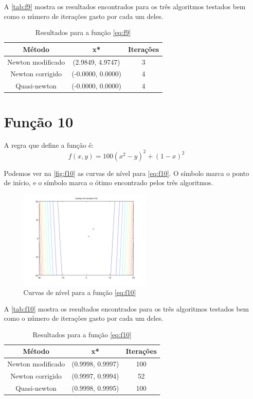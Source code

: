 \documentclass[12pt]{article}
\begin{document}
A \autoref{tab:f9} mostra os resultados encontrados para os três algoritmos testados bem como o número de iterações gasto por cada um deles.

\begin{table}[H]
\centering
\begin{tabular}{*3c}
\toprule
Método			&	x*		&	Iterações\\
\midrule
Newton modificado	&	(2.9849, 4.9747)	&	3\\
Newton corrigido	&	(-0.0000, 0.0000)	&	4\\
Quasi-newton		&	(-0.0000, 0.0000)	&	4\\
\bottomrule
\end{tabular}
\caption{\small{Resultados para a função \autoref{eq:f9} }}
\label{tab:f9}
\end{table}


\section{Função 10}
A regra que define a função é:
\begin{equation}
\label{eq:f10}
f(x, y) = 100(x^2 -y)^2 + (1 - x)^2
\end{equation}

Podemos ver na \autoref{fig:f10} as curvas de nível para \autoref{eq:f10}. O símbolo \textit{\textopenbullet} marca o ponto de início,
e o símbolo \textit{\texttimes} marca o ótimo encontrado pelos três algoritmos.

\begin{figure}[H]
  \centering
  \includegraphics[width=250px]{../matlab/images/f10_contour}
  \caption{Curvas de nível para a função \autoref{eq:f10}}
  \label{fig:f10}
\end{figure}

A \autoref{tab:f10} mostra os resultados encontrados para os três algoritmos testados bem como o número de iterações gasto por cada um deles.

\begin{table}[H]
\centering
\begin{tabular}{*3c}
\toprule
Método			&	x*		&	Iterações\\
\midrule
Newton modificado	&	(0.9998, 0.9997)	&	100\\
Newton corrigido	&	(0.9997, 0.9994)	&	52\\
Quasi-newton		&	(0.9998, 0.9995)	&	100\\
\bottomrule
\end{tabular}
\caption{\small{Resultados para a função \autoref{eq:f10} }}
\label{tab:f10}
\end{table}
\end{document}
